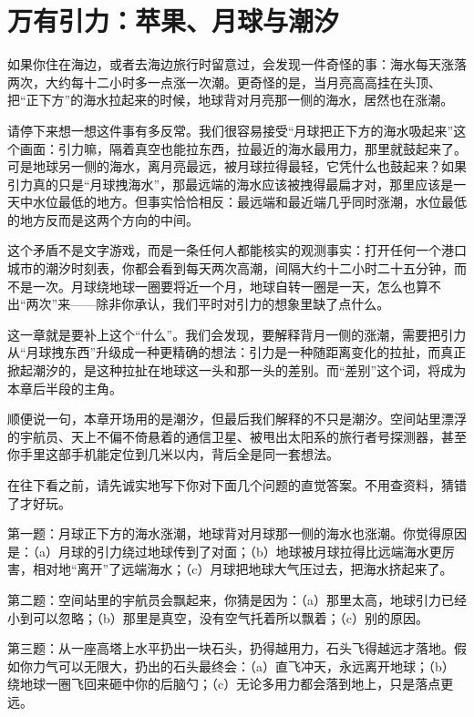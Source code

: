 \chapter{万有引力：苹果、月球与潮汐}


如果你住在海边，或者去海边旅行时留意过，会发现一件奇怪的事：海水每天涨落两次，大约每十二小时多一点涨一次潮。更奇怪的是，当月亮高高挂在头顶、把“正下方”的海水拉起来的时候，地球背对月亮那一侧的海水，居然也在涨潮。

请停下来想一想这件事有多反常。我们很容易接受“月球把正下方的海水吸起来”这个画面：引力嘛，隔着真空也能拉东西，拉最近的海水最用力，那里就鼓起来了。可是地球另一侧的海水，离月亮最远，被月球拉得最轻，它凭什么也鼓起来？如果引力真的只是“月球拽海水”，那最远端的海水应该被拽得最扁才对，那里应该是一天中水位最低的地方。但事实恰恰相反：最远端和最近端几乎同时涨潮，水位最低的地方反而是这两个方向的中间。

这个矛盾不是文字游戏，而是一条任何人都能核实的观测事实：打开任何一个港口城市的潮汐时刻表，你都会看到每天两次高潮，间隔大约十二小时二十五分钟，而不是一次。月球绕地球一圈要将近一个月，地球自转一圈是一天，怎么也算不出“两次”来——除非你承认，我们平时对引力的想象里缺了点什么。

这一章就是要补上这个“什么”。我们会发现，要解释背月一侧的涨潮，需要把引力从“月球拽东西”升级成一种更精确的想法：引力是一种随距离变化的拉扯，而真正掀起潮汐的，是这种拉扯在地球这一头和那一头的差别。而“差别”这个词，将成为本章后半段的主角。

顺便说一句，本章开场用的是潮汐，但最后我们解释的不只是潮汐。空间站里漂浮的宇航员、天上不偏不倚悬着的通信卫星、被甩出太阳系的旅行者号探测器，甚至你手里这部手机能定位到几米以内，背后全是同一套想法。


在往下看之前，请先诚实地写下你对下面几个问题的直觉答案。不用查资料，猜错了才好玩。

第一题：月球正下方的海水涨潮，地球背对月球那一侧的海水也涨潮。你觉得原因是：（a）月球的引力绕过地球传到了对面；（b）地球被月球拉得比远端海水更厉害，相对地“离开”了远端海水；（c）月球把地球大气压过去，把海水挤起来了。

第二题：空间站里的宇航员会飘起来，你猜是因为：（a）那里太高，地球引力已经小到可以忽略；（b）那里是真空，没有空气托着所以飘着；（c）别的原因。

第三题：从一座高塔上水平扔出一块石头，扔得越用力，石头飞得越远才落地。假如你力气可以无限大，扔出的石头最终会：（a）直飞冲天，永远离开地球；（b）绕地球一圈飞回来砸中你的后脑勺；（c）无论多用力都会落到地上，只是落点更远。

